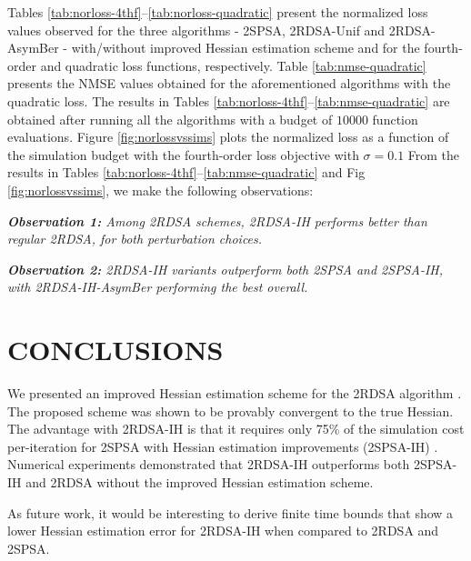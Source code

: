 \documentclass[letterpaper, 10 pt, conference]{ieeeconf}  %
\begin{document}
Tables \ref{tab:norloss-4thf}--\ref{tab:norloss-quadratic} present the normalized loss values observed for the three algorithms - 2SPSA, 2RDSA-Unif and 2RDSA-AsymBer - with/without improved Hessian estimation scheme and for the fourth-order and quadratic loss functions, respectively. Table \ref{tab:nmse-quadratic} presents the NMSE values obtained for the aforementioned algorithms with the quadratic loss. The results in Tables \ref{tab:norloss-4thf}--\ref{tab:nmse-quadratic} are obtained after running all the algorithms with a budget of $10000$ function evaluations.
 Figure \ref{fig:norlossvssims} plots the normalized loss as a function of the simulation budget with the fourth-order loss objective with $\sigma=0.1$ 
 From the results in Tables \ref{tab:norloss-4thf}--\ref{tab:nmse-quadratic} and Fig \ref{fig:norlossvssims}, we make the following observations:
 
\textit{\textbf{Observation 1:} Among 2RDSA schemes, 2RDSA-IH performs better than regular 2RDSA, for both perturbation choices.}

\textit{\textbf{Observation 2:} 2RDSA-IH variants outperform both 2SPSA and 2SPSA-IH, with 2RDSA-IH-AsymBer performing the best overall.}






\section{CONCLUSIONS}
\label{sec:conclusions}
We presented an improved Hessian estimation scheme for the 2RDSA algorithm \cite{prashanth2015rdsa}. 
The proposed scheme was shown to be provably convergent to the true Hessian.
The advantage with 2RDSA-IH is that it requires only 75\% of the simulation cost per-iteration for 2SPSA with Hessian estimation improvements (2SPSA-IH) \cite{spall-jacobian}. 
Numerical experiments demonstrated that 2RDSA-IH outperforms both 2SPSA-IH and 2RDSA without the improved Hessian estimation scheme.

As future work, it would be interesting to derive finite time bounds that show a lower Hessian estimation error for 2RDSA-IH when compared to 2RDSA and 2SPSA.
\end{document}
